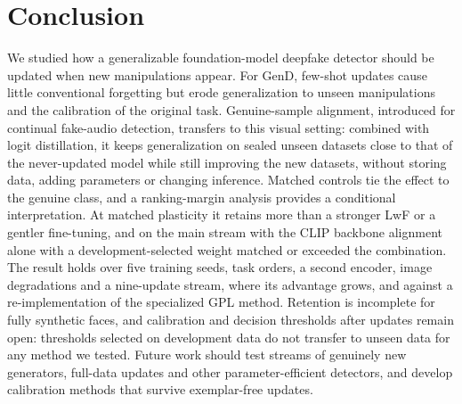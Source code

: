\documentclass[journal]{IEEEtran}
\begin{document}
\section{Conclusion}

We studied how a generalizable foundation-model deepfake detector should be updated when new manipulations appear. For GenD, few-shot updates cause little conventional forgetting but erode generalization to unseen manipulations and the calibration of the original task. Genuine-sample alignment, introduced for continual fake-audio detection, transfers to this visual setting: combined with logit distillation, it keeps generalization on sealed unseen datasets close to that of the never-updated model while still improving the new datasets, without storing data, adding parameters or changing inference. Matched controls tie the effect to the genuine class, and a ranking-margin analysis provides a conditional interpretation. At matched plasticity it retains more than a stronger LwF or a gentler fine-tuning, and on the main stream with the CLIP backbone alignment alone with a development-selected weight matched or exceeded the combination. The result holds over five training seeds, task orders, a second encoder, image degradations and a nine-update stream, where its advantage grows, and against a re-implementation of the specialized GPL method. Retention is incomplete for fully synthetic faces, and calibration and decision thresholds after updates remain open: thresholds selected on development data do not transfer to unseen data for any method we tested. Future work should test streams of genuinely new generators, full-data updates and other parameter-efficient detectors, and develop calibration methods that survive exemplar-free updates.

\balance


\end{document}
